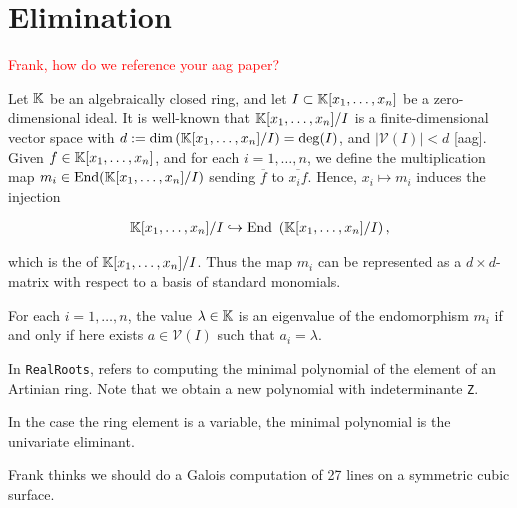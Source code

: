 


\section{Elimination}


\textcolor{red}{Frank, how do we reference your aag paper?}

Let $\mathbb{K}$ be an algebraically closed ring, and let $I\subset \mathbb{K}[x_{1},\dots,x_{n}]$ be a zero-dimensional ideal. It is well-known that $\mathbb{K}[x_{1},\dots,x_{n}]/I$ is a finite-dimensional vector space with $d:=\text{dim}\left( \mathbb{K}[x_{1},
\dots, x_{n}]/I \right) = \deg(I)$, and $|\mathcal{V}(I)|< d$ [aag]. Given $f\in \mathbb{K}[x_{1},\dots, x_{n}]$, and for each $i=1,\dots,n$, we define the multiplication map $m_{i}\in \text{End} (\mathbb{K}[x_{1},\dots, x_{n}]/I)$ sending $\overline{f}$ to $\overline{x_{i}f}$. Hence, $x_{i}\mapsto m_{i}$ induces the injection

\begin{align*}\mathbb{K}[x_{1},\dots,x_{n}]/I \hookrightarrow \text{End }\left(\mathbb{K}[x_{1},\dots, x_{n}]/I \right), \end{align*}

which is the  of $\mathbb{K}[x_{1},\dots,x_{n}]/I$. Thus the map $m_{i}$ can be represented as a $d\times d$-matrix with respect to a basis of standard monomials.

\begin{theorem} For each $i=1,\dots, n$, the value $\lambda \in \mathbb{K}$ is an eigenvalue of the endomorphism $m_{i}$ if and only if here exists $a\in \mathcal{V}(I)$ such that $a_{i}=\lambda$.
\end{theorem}

In \texttt{RealRoots},  refers to computing the minimal polynomial of the element of an Artinian ring. Note that we obtain a new polynomial with indeterminante \texttt{Z}.
%
\begin{leftbar}

\end{leftbar}

In the case the ring element is a variable, the minimal polynomial is the univariate eliminant.
%
\begin{leftbar}

\end{leftbar}
%





%



{\color{red} Frank thinks we should do a Galois computation of 27 lines on a symmetric cubic surface.}

